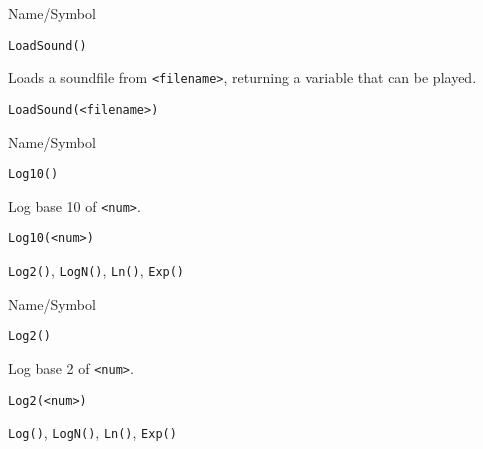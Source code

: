 \rl



\begin{desc}{Name/Symbol}
\item[Name/Symbol]	\verb+LoadSound()+

\item[Description]	Loads a soundfile from \verb+<filename>+, 
		returning a variable that can be played.

\item[Usage]
\begin{verbatim}
LoadSound(<filename>)
\end{verbatim}

\item[Example]	

\item[See Also]	
\end{desc}

\rl



\begin{desc}{Name/Symbol}
\item[Name/Symbol]	\verb+Log10()+

\item[Description]	Log base 10 of \verb+<num>+.

\item[Usage]
\begin{verbatim}
Log10(<num>)
\end{verbatim}

\item[Example]	

\item[See Also]	\verb+Log2()+, \verb+LogN()+, \verb+Ln()+, \verb+Exp()+
\end{desc}

\rl


\begin{desc}{Name/Symbol}
\item[Name/Symbol]	\verb+Log2()+

\item[Description]	Log base 2 of \verb+<num>+.

\item[Usage]
\begin{verbatim}
Log2(<num>)
\end{verbatim}

\item[Example]	

\item[See Also]	\verb+Log()+, \verb+LogN()+, \verb+Ln()+, \verb+Exp()+
\end{desc}

